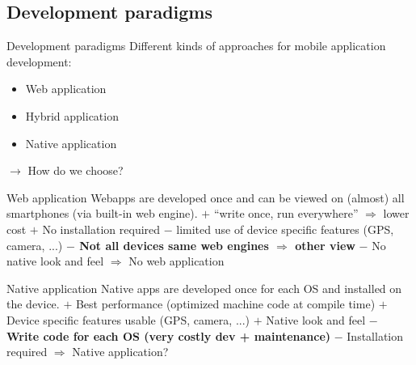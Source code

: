 \documentclass[english]{beamer}
\begin{document}
\subsection{Development paradigms}
\begin{frame}{Development paradigms}
	Different kinds of approaches for mobile application development:
	\begin{itemize}
		\item Web application
		\item Hybrid application
		\item Native application
	\end{itemize}
	$\rightarrow$ How do we choose?
\end{frame}
\begin{frame}{Web application}
	Webapps are developed once and can be viewed on (almost) all smartphones (via built-in web engine).\newline
	\newline
	$+$ ``write once, run everywhere'' $\Rightarrow$ lower cost\newline
	$+$ No installation required\newline
	$-$ limited use of device specific features (GPS, camera, ...)\newline
	\textbf{$-$ Not all devices same web engines $\Rightarrow$ other view}\newline
	$-$ No native look and feel\newline
	\newline
	{\Large \color{red}  $\Rightarrow$ No web application}
\end{frame}

\begin{frame}{Native application}
	Native apps are developed once for each OS and installed on the device.\newline
	\newline
	$+$ Best performance (optimized machine code at compile time)\newline
	$+$ Device specific features usable (GPS, camera, ...)\newline
	$+$ Native look and feel\newline
	\textbf{$-$ Write code for each OS (very costly dev + maintenance)}\newline
	$-$ Installation required\newline
	\newline
	{\Large \color{red}  $\Rightarrow$ Native application?}
\end{frame}
\end{document}
